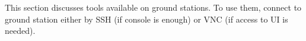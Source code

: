 This section discusses tools available on ground stations. To use them, connect to ground station either by SSH (if console is enough) or VNC (if access to UI is needed).